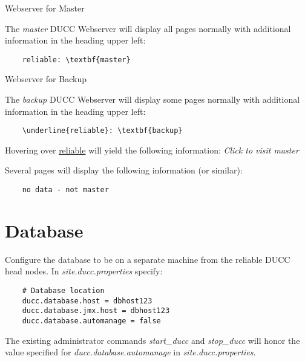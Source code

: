 	Webserver for Master

	The {\em master} DUCC Webserver will display all pages normally with additional
	information in the heading upper left:
	
	\begin{verbatim}
	reliable: \textbf{master}
   	\end{verbatim}
	
	Webserver for Backup
	
	The {\em backup} DUCC Webserver will display some pages normally with additional
	information in the heading upper left:
	
	\begin{verbatim}
	\underline{reliable}: \textbf{backup}
   	\end{verbatim}
   	
   	Hovering over \underline{reliable} will yield the following information:
   	{\em Click to visit master}
   	
   	Several pages will display the following information (or similar):
   	
   	\begin{verbatim}
	no data - not master
   	\end{verbatim}

\section{Database}

	Configure the database to be on a separate machine from the reliable DUCC head nodes.
	In {\em site.ducc.properties} specify:
	
	\begin{verbatim}
	# Database location
    ducc.database.host = dbhost123
    ducc.database.jmx.host = dbhost123
    ducc.database.automanage = false
   	\end{verbatim}
   	
   	The existing administrator commands {\em start\_ducc} and {\em stop\_ducc} will
   	honor the value specified for {\em ducc.database.automanage} in {\em site.ducc.properties}.

